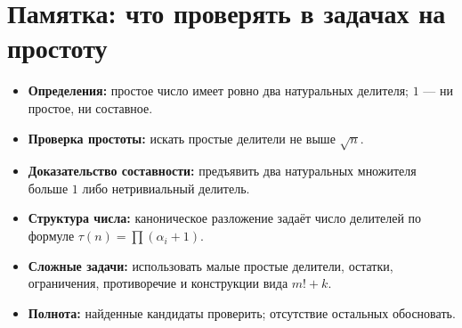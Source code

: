 \documentclass[11pt,a4paper]{article}
\begin{document}
\section*{Памятка: что проверять в задачах на простоту}
\begin{itemize}
\item \textbf{Определения:} простое число имеет ровно два натуральных делителя; $1$ --- ни простое, ни составное.
\item \textbf{Проверка простоты:} искать простые делители не выше $\sqrt n$.
\item \textbf{Доказательство составности:} предъявить два натуральных множителя больше $1$ либо нетривиальный делитель.
\item \textbf{Структура числа:} каноническое разложение задаёт число делителей по формуле $\tau(n)=\prod(\alpha_i+1)$.
\item \textbf{Сложные задачи:} использовать малые простые делители, остатки, ограничения, противоречие и конструкции вида $m!+k$.
\item \textbf{Полнота:} найденные кандидаты проверить; отсутствие остальных обосновать.
\end{itemize}
\end{document}
